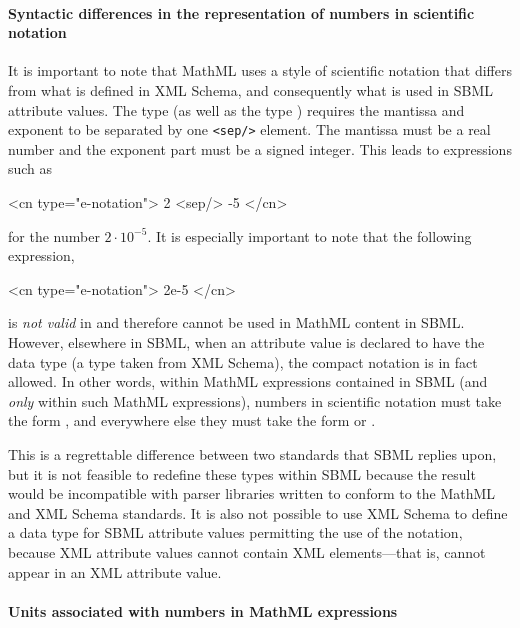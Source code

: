 \paragraph{Syntactic differences in the representation of numbers
  in scientific notation}

It is important to note that MathML uses a style of scientific
notation that differs from what is defined in XML Schema, and
consequently what is used in SBML attribute values.  The
\mathmltwo type 
(as well as the type )
requires the mantissa and
exponent to be separated by one \texttt{<sep/>} element.  The
mantissa must be a real number and the exponent part must be a
signed integer.  This leads to expressions such as

\begin{example}
<cn type="e-notation"> 2 <sep/> -5 </cn>
\end{example}

for the number $2 \cdot 10^{-5}$.  It is especially
important to note that the following expression,

\begin{example}
<cn type="e-notation"> 2e-5 </cn>
\end{example}

is \emph{not valid} in \mathmltwo and therefore cannot be used in
MathML content in SBML.  However, elsewhere in SBML, when an
attribute value is declared to have the data type
 (a type taken from XML Schema), the compact
notation  is in fact allowed.  In other words, within
MathML expressions contained in SBML (and \emph{only} within such
MathML expressions), numbers in scientific notation must take the
form , and
everywhere else they must take the form  or .

This is a regrettable difference between two standards that SBML
replies upon, but it is not feasible to redefine these types
within SBML because the result would be incompatible with parser
libraries written to conform to the MathML and XML Schema
standards.  It is also not possible to use XML Schema to define a
data type for SBML attribute values permitting the use of the
 notation, because XML attribute values cannot
contain XML elements---that is,  cannot appear in an
XML attribute value.


\paragraph{Units associated with numbers in MathML  expressions}
\label{sec:units-of-mathml}

